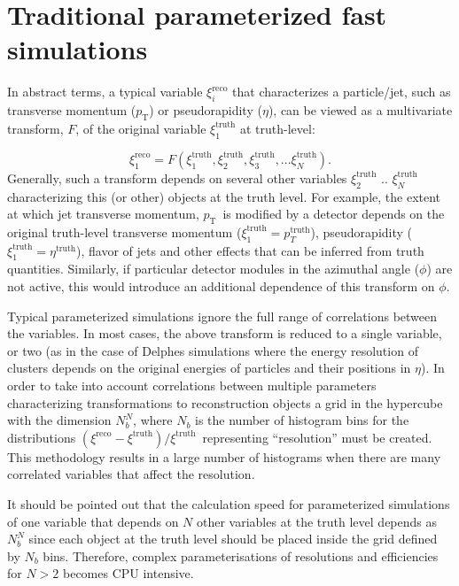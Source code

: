 \documentclass[showpacs,showkeys,preprint,prd,nofootinbib,linenumbers,12pt,superscriptaddress]{revtex4-1}
\def\pt{\ensuremath{p_{\mathrm{T}}}}
\def\genRes{\ensuremath{(\xi^{\mathrm{reco}}-\xi^{\mathrm{truth}})/\xi^{\mathrm{truth}}}}
\begin{document}
\section{Traditional parameterized fast simulations}

In abstract terms, a typical variable $\xi_i^{\mathrm{reco}}$ that characterizes a particle/jet, such as transverse momentum (\pt) or pseudorapidity ($\eta$), can be viewed as a multivariate transform, $F$, of the original variable $\xi_1^{\mathrm{truth}}$ at truth-level:

$$
\xi_1^{\mathrm{reco}} = F (\xi_1^{\mathrm{truth}}, \xi_2^{\mathrm{truth}}, \xi_3^{\mathrm{truth}}, ...\xi_N^{\mathrm{truth}}).
$$
Generally, such a transform  depends on several other variables $\xi_2^{\mathrm{truth}}$ ..  $\xi_N^{\mathrm{truth}}$ characterizing this (or other) objects at the truth level. For example, the extent at which jet transverse momentum, \pt\ is modified by a detector depends on the original truth-level transverse momentum ($\xi_1^{\mathrm{truth}}=p_T^{\mathrm{truth}}$), pseudorapidity ($\xi_1^{\mathrm{truth}}=\eta^{\mathrm{truth}}$), flavor of jets and other effects that can be inferred from truth quantities. Similarly, if particular detector modules in the azimuthal angle ($\phi$) are not active, this would introduce an additional dependence of this transform on $\phi$.

Typical parameterized simulations ignore the full range of correlations between the variables. In most cases, the above transform is reduced to a single variable, or two (as in the case of Delphes simulations where the energy resolution of clusters depends on the original energies of particles and their positions in $\eta$). In order to take into account correlations between multiple parameters characterizing transformations to reconstruction objects a grid in the hypercube with the dimension $N_b^N$, where $N_b$ is the number of histogram bins for the distributions \genRes\ representing ``resolution'' must be created. This methodology results in a large number of histograms when there are many correlated variables that affect the resolution.

It should be pointed out that the calculation speed for parameterized simulations of one variable that depends on $N$ other variables at the truth level depends  as $N_b^N$ since each object at the truth level should be placed inside the grid defined by $N_b$ bins. Therefore, complex parameterisations of resolutions and efficiencies for $N>2$ becomes CPU intensive. 
\end{document}
